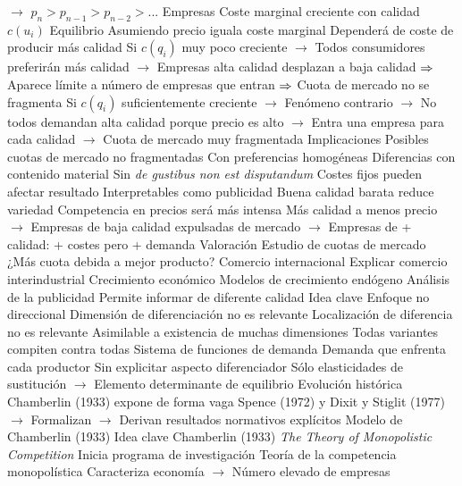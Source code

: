 \documentclass{nuevotema}
\begin{document}
\begin{esquemal}
				\4[] $\to$ $p_n > p_{n-1} > p_{n-2} > ...$
				\4 Empresas
				\4[] Coste marginal creciente con calidad $c(u_i)$
				\4 Equilibrio
				\4[] Asumiendo precio iguala coste marginal
				\4[] Dependerá de coste de producir más calidad
				\4[] Si $c(q_i)$ muy poco creciente
				\4[] $\to$ Todos consumidores preferirán más calidad
				\4[] $\to$ Empresas alta calidad desplazan a baja calidad
				\4[] $\Rightarrow$ Aparece límite a número de empresas que entran
				\4[] $\Rightarrow$ Cuota de mercado no se fragmenta
				\4[] Si $c(q_i)$ suficientemente creciente
				\4[] $\to$ Fenómeno contrario
				\4[] $\to$ No todos demandan alta calidad porque precio es alto
				\4[] $\to$ Entra una empresa para cada calidad
				\4[] $\to$ Cuota de mercado muy fragmentada
			\3 Implicaciones
				\4 Posibles cuotas de mercado no fragmentadas
				\4[] Con preferencias homogéneas
				\4 Diferencias con contenido material
				\4[] Sin \textit{de gustibus non est disputandum}
				\4 Costes fijos pueden afectar resultado
				\4[] Interpretables como publicidad
				\4 Buena calidad barata reduce variedad
				\4[] Competencia en precios será más intensa
				\4[] Más calidad a menos precio
				\4[] $\to$ Empresas de baja calidad expulsadas de mercado
				\4[] $\to$ Empresas de + calidad: + costes pero + demanda
			\3 Valoración
				\4 Estudio de cuotas de mercado
				\4[] ¿Más cuota debida a mejor producto?
				\4 Comercio internacional
				\4[] Explicar comercio interindustrial
				\4 Crecimiento económico
				\4[] Modelos de crecimiento endógeno
				\4 Análisis de la publicidad
				\4[] Permite informar de diferente calidad
	\1 
		\2 Idea clave
			\3 Enfoque no direccional
				\4 Dimensión de diferenciación no es relevante
				\4[] Localización de diferencia no es relevante
				\4 Asimilable a existencia de muchas dimensiones
				\4 Todas variantes compiten contra todas
			\3 Sistema de funciones de demanda
				\4 Demanda que enfrenta cada productor
				\4 Sin explicitar aspecto diferenciador
				\4[] Sólo elasticidades de sustitución
				\4[] $\to$ Elemento determinante de equilibrio
			\3 Evolución histórica
				\4 Chamberlin (1933) expone de forma vaga
				\4 Spence (1972) y Dixit y Stiglit (1977)
				\4[] $\to$ Formalizan
				\4[] $\to$ Derivan resultados normativos explícitos
		\2 Modelo de Chamberlin (1933)
			\3 Idea clave
				\4 Chamberlin (1933)
				\4[] \textit{The Theory of Monopolistic Competition}
				\4 Inicia programa de investigación
				\4[] Teoría de la competencia monopolística
				\4 Caracteriza economía
				\4[] $\to$ Número elevado de empresas

\end{esquemal}
\end{document}
